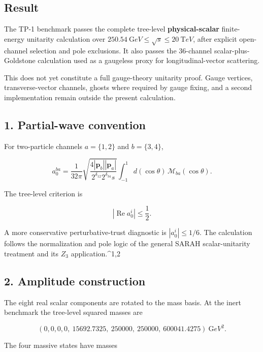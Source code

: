 \documentclass[
]{article}
\begin{document}
\hypertarget{result}{%
\subsection{Result}\label{result}}

The TP-1 benchmark passes the complete tree-level
\textbf{physical-scalar} finite-energy unitarity calculation over
\(250.54\ {\mathrm GeV}\le\sqrt{s}\le20\ {\mathrm TeV}\), after explicit
open-channel selection and pole exclusions. It also passes the
36-channel scalar-plus-Goldstone calculation used as a gaugeless proxy
for longitudinal-vector scattering.

This does not yet constitute a full gauge-theory unitarity proof. Gauge
vertices, transverse-vector channels, ghosts where required by gauge
fixing, and a second implementation remain outside the present
calculation.

\hypertarget{partial-wave-convention}{%
\subsection{1. Partial-wave convention}\label{partial-wave-convention}}

For two-particle channels \(a=\{1,2\}\) and \(b=\{3,4\}\),

\[
a_0^{ba}=
\frac{1}{32\pi}
\sqrt{\frac{4|\mathbf p_b||\mathbf p_a|}
{2^{\delta_{12}}2^{\delta_{34}}s}}
\int_{-1}^{1}d(\cos\theta)\,
\mathcal M_{ba}(\cos\theta).
\]

The tree-level criterion is

\[
\left|\operatorname{Re}a_0^i\right|\le\frac12.
\]

A more conservative perturbative-trust diagnostic is \(|a_0^i|\le1/6\).
The calculation follows the normalization and pole logic of the general
SARAH scalar-unitarity treatment and its \(Z_3\) application.\^{}1,2

\hypertarget{amplitude-construction}{%
\subsection{2. Amplitude construction}\label{amplitude-construction}}

The eight real scalar components are rotated to the mass basis. At the
inert benchmark the tree-level squared masses are

\[
(0,0,0,0,\ 15692.7325,\ 250000,\ 250000,\ 600041.4275)\ {\mathrm GeV}^2.
\]

The four massive states have masses
\end{document}
